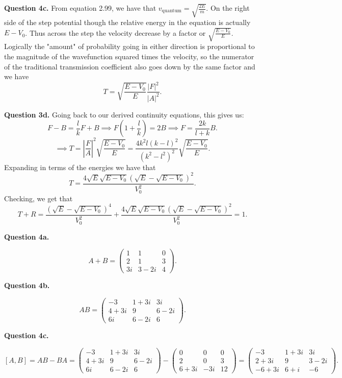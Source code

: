 \documentclass[letterpaper, reqno,11pt]{article}
\begin{document}
{\noindent\bf Question 4c.} From equation 2.99, we have that  $v_{\text{quantum}}=\sqrt{\frac{2E}{m}} $. On the right side of the step potential though the relative energy in the equation is actually $E-V_0$. Thus across the step the velocity decrease by a factor or $\sqrt{\frac{E-V_0}{E}} $. Logically the "amount" of probability going in either direction is proportional to the magnitude of the wavefunction squared times the velocity, so the numerator of the traditional transmission coefficient also goes down by the same factor and we have
\[
T=\sqrt{\frac{E-V_0}{E}} \frac{|F|^2}{|A|^2}
.\]

{\noindent\bf Question 3d.} Going back to our derived continuity equations, this gives us: 
\[
F-B=\frac{l}{k}F+B\implies F(1+\frac{l}{k})=2B\implies F=\frac{2k}{l+k}B
.\]
\[
\implies T=\left| \frac{F}{A} \right| ^2\sqrt{\frac{E-V_0}{E}}=\frac{4k^2l(k-l)^2}{(k^2-l^2)^2}\sqrt{\frac{E-V_0}{E}}
.\]
Expanding in terms of the energies we have that 
\[
T=\frac{4\sqrt{E} \sqrt{E-V_0}\left( \sqrt{E} -\sqrt{E-V_0}  \right)^2 }{V_0^2}
.\]
Checking, we get that
\[
T+R=\frac{\left( \sqrt{E} -\sqrt{E-V_0}  \right)^{4} }{V_0^2}+\frac{4\sqrt{E} \sqrt{E-V_0}\left( \sqrt{E} -\sqrt{E-V_0}  \right)^2 }{V_0^2}=1
.\]

{\noindent\bf Question 4a.} 

\[
    A+B=\begin{pmatrix} 1&1&0\\2&1&3\\3i&3-2i&4 \end{pmatrix} 
.\]

{\noindent\bf Question 4b.} 

\[
    AB=\begin{pmatrix} -3&1+3i&3i\\4+3i&9&6-2i\\6i&6-2i&6 \end{pmatrix} 
.\]

{\noindent\bf Question 4c.} 

\[
    [A,B]=AB-BA=\begin{pmatrix} -3&1+3i&3i\\4+3i&9&6-2i\\6i&6-2i&6 \end{pmatrix}-\begin{pmatrix} 0&0&0\\2&0&3\\6+3i&-3i&12 \end{pmatrix}=\begin{pmatrix} -3&1+3i&3i\\2+3i&9&3-2i\\-6+3i&6+i&-6 \end{pmatrix} 
.\]
\end{document}
